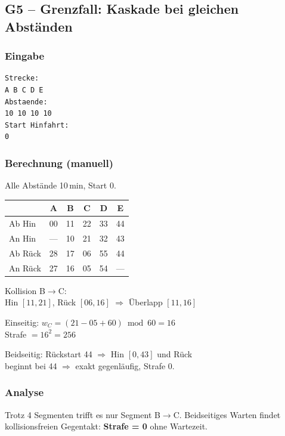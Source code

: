 \documentclass[12pt,a4paper]{article}
\begin{document}
\subsection{G5 – Grenzfall: Kaskade bei gleichen Abständen}
\label{test:g5}

\noindent
\begin{minipage}[t]{0.48\textwidth}
\scriptsize
\setlength{\tabcolsep}{2pt}

\subsubsection*{Eingabe}
\begin{lstlisting}
Strecke:
A B C D E
Abstaende:
10 10 10 10
Start Hinfahrt:
0
\end{lstlisting}

\subsubsection*{Berechnung (manuell)}
Alle Abstände 10\,min, Start 0.\\[2pt]
\begin{tabular}{l|ccccc}
\toprule
 & A & B & C & D & E\\
\midrule
Ab Hin  & 00 & 11 & 22 & 33 & 44\\
An Hin  & —  & 10 & 21 & 32 & 43\\
Ab Rück & 28 & 17 & 06 & 55 & 44\\
An Rück & 27 & 16 & 05 & 54 & —\\
\bottomrule
\end{tabular}

\vspace{4pt}
Kollision B$\to$C:\\
Hin $[11,21]$, Rück $[06,16]$ $\Rightarrow$ Überlapp $[11,16]$

\vspace{4pt}
Einseitig: $w_C = (21-05+60)\bmod 60 = 16$\\
Strafe $= 16^2 = 256$

\vspace{4pt}
Beidseitig: Rückstart 44 $\Rightarrow$ Hin $[0,43]$ und Rück\\
beginnt bei 44 $\Rightarrow$ exakt gegenläufig, Strafe 0.

\subsubsection*{Analyse}
Trotz 4 Segmenten trifft es nur Segment B$\to$C.
Beidseitiges Warten findet kollisionsfreien Gegentakt:
\textbf{Strafe = 0} ohne Wartezeit.
\end{minipage}
\end{document}
